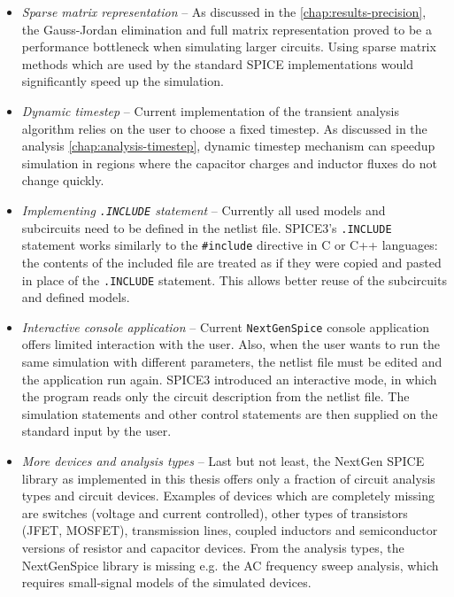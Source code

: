 \begin{itemize}
	\item \textit{Sparse matrix representation} -- As discussed in the \ref{chap:results-precision}, the Gauss-Jordan elimination and full matrix representation proved to be a performance bottleneck when simulating larger circuits. Using sparse matrix methods which are used by the standard SPICE implementations would significantly speed up the simulation.
	
	\item \textit{Dynamic timestep} -- Current implementation of the transient analysis algorithm relies on the user to choose a fixed timestep. As discussed in the analysis \ref{chap:analysis-timestep}, dynamic timestep mechanism can speedup simulation in regions where the capacitor charges and inductor fluxes do not change quickly.
	
	\item \textit{Implementing \texttt{.INCLUDE} statement} -- Currently all used models and subcircuits need to be defined in the netlist file. SPICE3's \texttt{.INCLUDE} statement works similarly to the \texttt{\#include} directive in C or C++ languages: the contents of the included file are treated as if they were copied and pasted in place of the \texttt{.INCLUDE} statement. This allows better reuse of the subcircuits and defined models.
	
	\item \textit{Interactive console application} -- Current \texttt{NextGenSpice} console application offers  limited interaction with the user. Also, when the user wants to run the same simulation with different parameters, the netlist file must be edited and the application run again. SPICE3 introduced an interactive mode, in which the program reads only the circuit description from the netlist file. The simulation statements and other control statements are then supplied on the standard input by the user.
	
	\item \textit{More devices and analysis types} -- Last but not least, the NextGen SPICE library as implemented in this thesis offers only a fraction of circuit analysis types and circuit devices. Examples of devices which are completely missing are switches (voltage and current controlled), other types of transistors (JFET, MOSFET), transmission lines, coupled inductors and semiconductor versions of resistor and capacitor devices. From the analysis types, the NextGenSpice library is missing e.g. the AC frequency sweep analysis, which requires small-signal models of the simulated devices.
\end{itemize}
